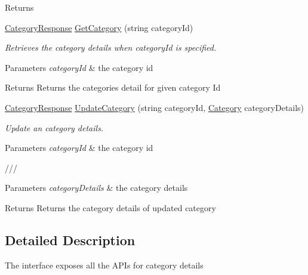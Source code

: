 \begin{DoxyCompactItemize}
\begin{DoxyCompactList}
\begin{DoxyReturn}{Returns}
\end{DoxyReturn}
\end{DoxyCompactList}\item 
\hyperlink{classWildLifeTracker_1_1Response_1_1CategoryResponse}{Category\+Response} \hyperlink{interfaceWildLifeTracker_1_1ICategoryService_ac989af6747cc8b28f508ef7a4645d22f}{Get\+Category} (string category\+Id)
\begin{DoxyCompactList}\small\item\em Retrieves the category details when category\+Id is specified. 
\begin{DoxyParams}{Parameters}
{\em category\+Id} & the category id\\
\hline
\end{DoxyParams}
\begin{DoxyReturn}{Returns}
Returns the categories detail for given category Id
\end{DoxyReturn}
\end{DoxyCompactList}\item 
\hyperlink{classWildLifeTracker_1_1Response_1_1CategoryResponse}{Category\+Response} \hyperlink{interfaceWildLifeTracker_1_1ICategoryService_adbaa7c66fd8789233e4d6f91ab3a4a2f}{Update\+Category} (string category\+Id, \hyperlink{classWildLifeTracker_1_1Models_1_1Category}{Category} category\+Details)
\begin{DoxyCompactList}\small\item\em Update an category details. 
\begin{DoxyParams}{Parameters}
{\em category\+Id} & the category id\\
\hline
\end{DoxyParams}
/// 
\begin{DoxyParams}{Parameters}
{\em category\+Details} & the category details\\
\hline
\end{DoxyParams}
\begin{DoxyReturn}{Returns}
Returns the category details of updated category
\end{DoxyReturn}
\end{DoxyCompactList}\end{DoxyCompactItemize}


\subsection{Detailed Description}
The interface exposes all the A\+P\+Is for category details 



